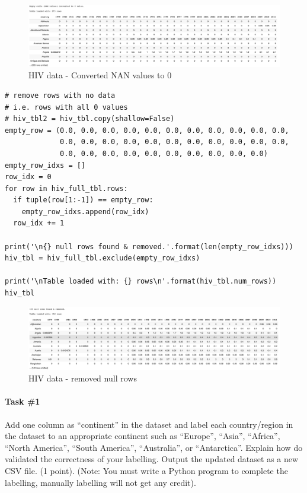 \documentclass[UTF8, letter]{article}
\begin{document}
\begin{figure}[h!]
	\centering
	\includegraphics[width=\linewidth]{output_2.png}
	\caption{HIV data - Converted NAN values to 0}
	\label{fig:boat1}
\end{figure}

\vspace{5mm}
\begin{codeblock}
\begin{verbatim}
# remove rows with no data
# i.e. rows with all 0 values
# hiv_tbl2 = hiv_tbl.copy(shallow=False)
empty_row = (0.0, 0.0, 0.0, 0.0, 0.0, 0.0, 0.0, 0.0, 0.0, 0.0, 0.0, 
             0.0, 0.0, 0.0, 0.0, 0.0, 0.0, 0.0, 0.0, 0.0, 0.0, 0.0, 
             0.0, 0.0, 0.0, 0.0, 0.0, 0.0, 0.0, 0.0, 0.0, 0.0)
empty_row_idxs = []
row_idx = 0
for row in hiv_full_tbl.rows:
  if tuple(row[1:-1]) == empty_row:
    empty_row_idxs.append(row_idx)
  row_idx += 1

print('\n{} null rows found & removed.'.format(len(empty_row_idxs)))
hiv_tbl = hiv_full_tbl.exclude(empty_row_idxs)

print('\nTable loaded with: {} rows\n'.format(hiv_tbl.num_rows))
hiv_tbl\end{verbatim}
\end{codeblock}

\begin{figure}[h!]
	\centering
	\includegraphics[width=\linewidth]{output_3.png}
	\caption{HIV data - removed null rows}
	\label{fig:boat1}
\end{figure}



\pagebreak
\paragraph{Task \#1}
Add one column as “continent” in the dataset and label each country/region in the dataset to an appropriate continent such as “Europe”, “Asia”, “Africa”, “North America”, “South America”, “Australia”, or “Antarctica”. Explain how do validated the correctness of your labelling. Output the updated dataset as a new CSV file. (1 point). (Note: You must write a Python program to complete the labelling, manually labelling will not get any credit).
\end{document}

